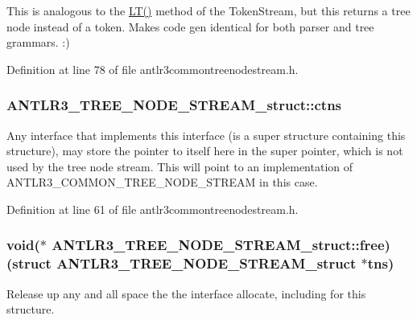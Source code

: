 This is analogous to the \hyperlink{cif_parser_8cpp_a835a564399f4498da6ccbef2dcdd277e}{L\-T()} method of the Token\-Stream, but this returns a tree node instead of a token. Makes code gen identical for both parser and tree grammars. \-:) 

Definition at line 78 of file antlr3commontreenodestream.\-h.

\hypertarget{struct_a_n_t_l_r3___t_r_e_e___n_o_d_e___s_t_r_e_a_m__struct_a844d639cc5d64bd4b5caef3c5bfecbbe}{
\subsubsection[{ctns}]{ A\-N\-T\-L\-R3\-\_\-\-T\-R\-E\-E\-\_\-\-N\-O\-D\-E\-\_\-\-S\-T\-R\-E\-A\-M\-\_\-struct\-::ctns}}\label{struct_a_n_t_l_r3___t_r_e_e___n_o_d_e___s_t_r_e_a_m__struct_a844d639cc5d64bd4b5caef3c5bfecbbe}
Any interface that implements this interface (is a super structure containing this structure), may store the pointer to itself here in the super pointer, which is not used by the tree node stream. This will point to an implementation of A\-N\-T\-L\-R3\-\_\-\-C\-O\-M\-M\-O\-N\-\_\-\-T\-R\-E\-E\-\_\-\-N\-O\-D\-E\-\_\-\-S\-T\-R\-E\-A\-M in this case. 

Definition at line 61 of file antlr3commontreenodestream.\-h.

\hypertarget{struct_a_n_t_l_r3___t_r_e_e___n_o_d_e___s_t_r_e_a_m__struct_a1a026ae809753b3db3f6ad689ead33af}{
\subsubsection[{free}]{\setlength{\rightskip}{0pt plus 5cm}void($\ast$ A\-N\-T\-L\-R3\-\_\-\-T\-R\-E\-E\-\_\-\-N\-O\-D\-E\-\_\-\-S\-T\-R\-E\-A\-M\-\_\-struct\-::free)(struct {\bf A\-N\-T\-L\-R3\-\_\-\-T\-R\-E\-E\-\_\-\-N\-O\-D\-E\-\_\-\-S\-T\-R\-E\-A\-M\-\_\-struct} $\ast$tns)}}\label{struct_a_n_t_l_r3___t_r_e_e___n_o_d_e___s_t_r_e_a_m__struct_a1a026ae809753b3db3f6ad689ead33af}
Release up any and all space the the interface allocate, including for this structure. 

